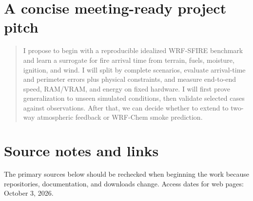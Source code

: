 \documentclass[11pt]{article}
\begin{document}
\section{A concise meeting-ready project pitch}

\begin{quote}
I propose to begin with a reproducible idealized WRF-SFIRE benchmark and learn a surrogate for fire arrival time from terrain, fuels, moisture, ignition, and wind. I will split by complete scenarios, evaluate arrival-time and perimeter errors plus physical constraints, and measure end-to-end speed, RAM/VRAM, and energy on fixed hardware. I will first prove generalization to unseen simulated conditions, then validate selected cases against observations. After that, we can decide whether to extend to two-way atmospheric feedback or WRF-Chem smoke prediction.
\end{quote}

\section{Source notes and links}

The primary sources below should be rechecked when beginning the work because repositories, documentation, and downloads change. Access dates for web pages: October 3, 2026.
\end{document}
